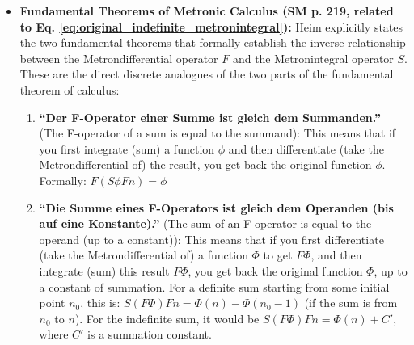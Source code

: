 \documentclass[12pt]{article}
\newcommand{\q}[1]{\enquote{#1}}
\newcommand{\metrondifferential}{F} %
\newcommand{\metronintegral}{S} %
\newcommand{\metronenziffer}{n}
\begin{document}
\begin{itemize}
    \item \textbf{Fundamental Theorems of Metronic Calculus (SM p. 219, related to Eq. \eqref{eq:original_indefinite_metronintegral}):}
    Heim explicitly states the two fundamental theorems that formally establish the inverse relationship between the Metrondifferential operator \( \metrondifferential \) and the Metronintegral operator \( \metronintegral \). These are the direct discrete analogues of the two parts of the fundamental theorem of calculus:
    \begin{enumerate}
        \item \textbf{\q{Der F-Operator einer Summe ist gleich dem Summanden.}} (The F-operator of a sum is equal to the summand):
        This means that if you first integrate (sum) a function \( \phi \) and then differentiate (take the Metrondifferential of) the result, you get back the original function \( \phi \). Formally:
        \( \metrondifferential(\metronintegral \phi \metrondifferential\metronenziffer) = \phi \)
        \item \textbf{\q{Die Summe eines F-Operators ist gleich dem Operanden (bis auf eine Konstante).}} (The sum of an F-operator is equal to the operand (up to a constant)):
        This means that if you first differentiate (take the Metrondifferential of) a function \( \Phi \) to get \( F\Phi \), and then integrate (sum) this result \( F\Phi \), you get back the original function \( \Phi \), up to a constant of summation. For a definite sum starting from some initial point \( n_0 \), this is:
        \( \metronintegral (\metrondifferential\Phi) \metrondifferential\metronenziffer = \Phi(\metronenziffer) - \Phi(n_0-1) \) (if the sum is from \(n_0\) to \(n\)). For the indefinite sum, it would be \( \metronintegral (\metrondifferential\Phi) \metrondifferential\metronenziffer = \Phi(\metronenziffer) + C' \), where \(C'\) is a summation constant.
    \end{enumerate}


\end{itemize}
\end{document}
